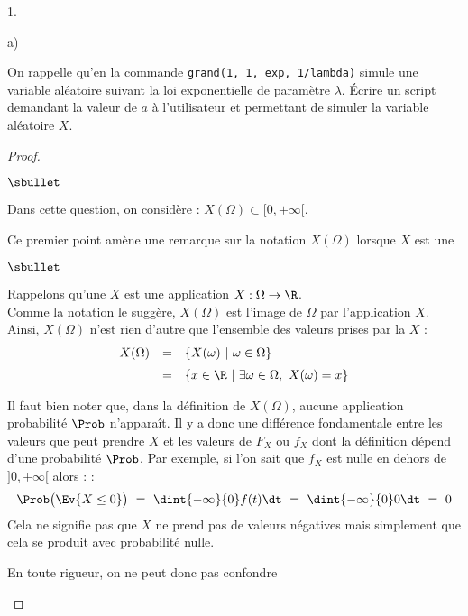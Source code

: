 \documentclass[11pt]{article}%
\begin{document}
\begin{noliste}{1.}
\begin{noliste}{a)}
  \item On rappelle qu'en \Scilab{} la commande {\tt grand(1, 1,
      \ttq{}exp\ttq{}, 1/lambda)} simule une variable aléatoire
    suivant la loi exponentielle de paramètre $\lambda$. Écrire un
    script \Scilab{} demandant la valeur de $a$ à l'utilisateur et
    permettant de simuler la variable aléatoire $X$.
    
    \begin{proof}~%
      \begin{noliste}{$\sbullet$}
      \item Dans cette question, on considère : $X(\Omega) \subset [0,
        +\infty[$.
        \begin{remark}%
          Ce premier point amène une remarque sur la notation
          $X(\Omega)$ lorsque $X$ est une \var
          \begin{noliste}{$\sbullet$}
          \item Rappelons qu'une \var $X$ est une application $X :
            \Omega \to \R$.\\
            Comme la notation le suggère, $X(\Omega)$ est l'image de
            $\Omega$ par l'application $X$. \\
            Ainsi, $X(\Omega)$ n'est rien d'autre que l'ensemble des
            valeurs prises par la \var $X$ :
            \[
            \begin{array}{rcl}
              X(\Omega) & = & \{ X(\omega) \ | \ \omega \in \Omega\}
              \\[.2cm]
              & = & \{ x \in \R \ | \ \exists \omega \in \Omega, \ X(\omega) =
              x \}
            \end{array}
            \]
          \item Il faut bien noter que, dans la définition de
            $X(\Omega)$, aucune application probabilité $\Prob$
            n'apparaît. Il y a donc une différence fondamentale entre
            les valeurs que peut prendre $X$ et les valeurs de $F_X$
            ou $f_X$ dont la définition dépend d'une probabilité
            $\Prob$. Par exemple, si l'on sait que $f_X$ est nulle en
            dehors de $]0, +\infty[$ alors : :
            \[
            \Prob\big(\Ev{X \leq 0} \big) \ = \ \dint{-\infty}{0} f(t)
            \dt \ = \ \dint{-\infty}{0} 0 \dt \ = \ 0
            \]
            Cela ne signifie pas que $X$ ne prend pas de valeurs
            négatives mais simplement que cela se produit avec
            probabilité nulle.
          \item En toute rigueur, on ne peut donc pas confondre

\end{noliste}
\end{remark}
\end{noliste}
\end{proof}
\end{noliste}
\end{noliste}
\end{document}
